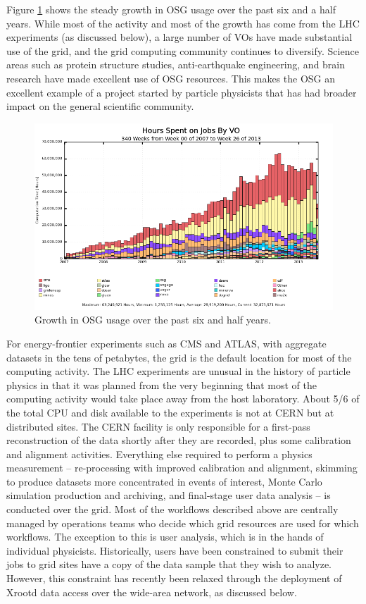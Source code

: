 Figure \ref{fig:OSG-growth} shows the steady growth in OSG usage over the past six and a half years.  While most of the activity and most of the growth has come from the LHC experiments (as discussed below), a large number of VOs have made substantial use of the grid, and the grid computing community continues to diversify.  Science areas such as protein structure studies, anti-earthquake engineering, and brain research have made excellent use of OSG resources.  This makes the OSG an excellent example of a project started by particle physicists that has had broader impact on the general scientific community. 

\begin{figure}[h]
\includegraphics[width=\textwidth]{CpF-I2/images/vo_hours_bar_smry.png}
\caption{Growth in OSG usage over the past six and half years.}
\label{fig:OSG-growth}
\end{figure}

For energy-frontier experiments such as CMS and ATLAS, with aggregate datasets in the tens of petabytes, the grid is the default location for most of the computing activity.  The LHC experiments are unusual in the history of particle physics in that it was planned from the very beginning that most of the computing activity would take place away from the host laboratory.  About 5/6 of the total CPU and disk available to the experiments is not at CERN but at distributed sites.  The CERN facility is only responsible for a first-pass reconstruction of the data shortly after they are recorded, plus some calibration and alignment activities.  Everything else required to perform a physics measurement -- re-processing with improved calibration and alignment, skimming to produce datasets more concentrated in events of interest, Monte Carlo simulation production and archiving, and final-stage user data analysis -- is conducted over the grid.  Most of the workflows described above are centrally managed by operations teams who decide which grid resources are used for which workflows.  The exception to this is user analysis, which is in the hands of individual physicists.  Historically, users have been constrained to submit their jobs to grid sites have a copy of the data sample that they wish to analyze.  However, this constraint has recently been relaxed through the deployment of Xrootd data access over the wide-area network, as discussed below.

